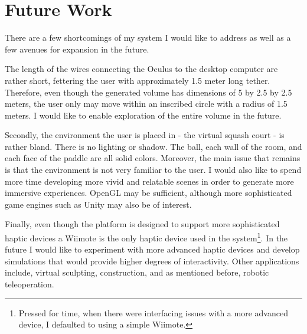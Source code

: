 \section{Future Work}
\label{sec:future}

There are a few shortcomings of my system I would like to address as well 
as a few avenues for expansion in the future. 

The length of the wires connecting the Oculus to the desktop computer are
rather short, fettering the user with approximately 1.5 meter long tether.
Therefore, even though the generated volume has dimensions of 5 by 2.5 by 2.5
meters, the user only may move within an inscribed circle with a radius of 1.5
meters.  I would like to enable exploration of the entire volume in the future. 

Secondly, the environment the user is placed in - the virtual squash court - is
rather bland. There is no lighting or shadow. The ball, each wall of the room,
and each face of the paddle are all solid colors. Moreover, the main issue that
remains is that the environment is not very familiar to the user. I would
also like to spend more time developing more vivid and relatable scenes in order
to generate more immersive experiences. OpenGL may be sufficient, although
more sophisticated game engines such as Unity \cite{website:unity} may also
be of interest.

Finally, even though the platform is designed to support more sophisticated
haptic devices a Wiimote is the only haptic device used in the
system\footnote{Pressed for time, when there were interfacing issues with a
more advanced device, I defaulted to using a simple Wiimote.}. In the future I
would like to experiment with more advanced haptic devices and develop
simulations that would provide higher degrees of interactivity. Other
applications include, virtual sculpting, construction, and as mentioned before,
robotic teleoperation.
